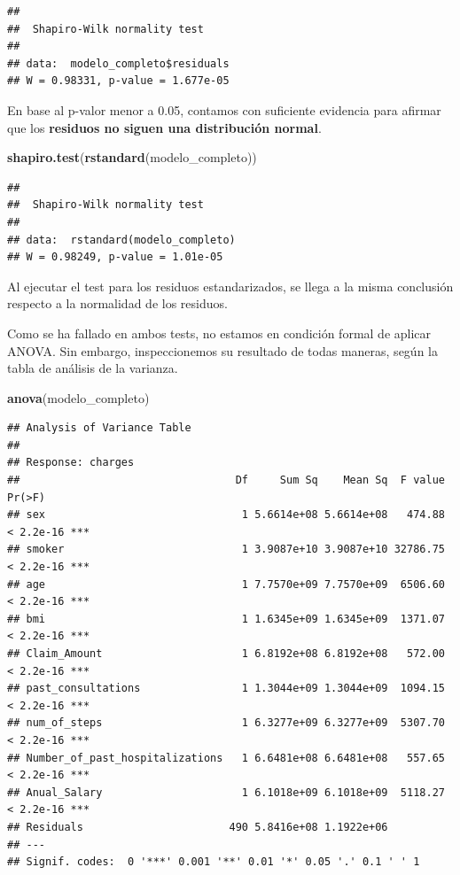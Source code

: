 \documentclass[
]{article}
\newenvironment{Shaded}{\begin{snugshade}}{\end{snugshade}}
\newcommand{\FunctionTok}[1]{\textcolor[rgb]{0.13,0.29,0.53}{\textbf{#1}}}
\newcommand{\NormalTok}[1]{#1}
\begin{document}
\begin{verbatim}
## 
##  Shapiro-Wilk normality test
## 
## data:  modelo_completo$residuals
## W = 0.98331, p-value = 1.677e-05
\end{verbatim}

En base al p-valor menor a 0.05, contamos con suficiente evidencia para
afirmar que los \textbf{residuos no siguen una distribución normal}.

\begin{Shaded}
\begin{Highlighting}[]
\FunctionTok{shapiro.test}\NormalTok{(}\FunctionTok{rstandard}\NormalTok{(modelo\_completo))}
\end{Highlighting}
\end{Shaded}

\begin{verbatim}
## 
##  Shapiro-Wilk normality test
## 
## data:  rstandard(modelo_completo)
## W = 0.98249, p-value = 1.01e-05
\end{verbatim}

Al ejecutar el test para los residuos estandarizados, se llega a la
misma conclusión respecto a la normalidad de los residuos.

Como se ha fallado en ambos tests, no estamos en condición formal de
aplicar ANOVA. Sin embargo, inspeccionemos su resultado de todas
maneras, según la tabla de análisis de la varianza.

\begin{Shaded}
\begin{Highlighting}[]
\FunctionTok{anova}\NormalTok{(modelo\_completo)}
\end{Highlighting}
\end{Shaded}

\begin{verbatim}
## Analysis of Variance Table
## 
## Response: charges
##                                  Df     Sum Sq    Mean Sq  F value    Pr(>F)    
## sex                               1 5.6614e+08 5.6614e+08   474.88 < 2.2e-16 ***
## smoker                            1 3.9087e+10 3.9087e+10 32786.75 < 2.2e-16 ***
## age                               1 7.7570e+09 7.7570e+09  6506.60 < 2.2e-16 ***
## bmi                               1 1.6345e+09 1.6345e+09  1371.07 < 2.2e-16 ***
## Claim_Amount                      1 6.8192e+08 6.8192e+08   572.00 < 2.2e-16 ***
## past_consultations                1 1.3044e+09 1.3044e+09  1094.15 < 2.2e-16 ***
## num_of_steps                      1 6.3277e+09 6.3277e+09  5307.70 < 2.2e-16 ***
## Number_of_past_hospitalizations   1 6.6481e+08 6.6481e+08   557.65 < 2.2e-16 ***
## Anual_Salary                      1 6.1018e+09 6.1018e+09  5118.27 < 2.2e-16 ***
## Residuals                       490 5.8416e+08 1.1922e+06                       
## ---
## Signif. codes:  0 '***' 0.001 '**' 0.01 '*' 0.05 '.' 0.1 ' ' 1
\end{verbatim}
\end{document}
